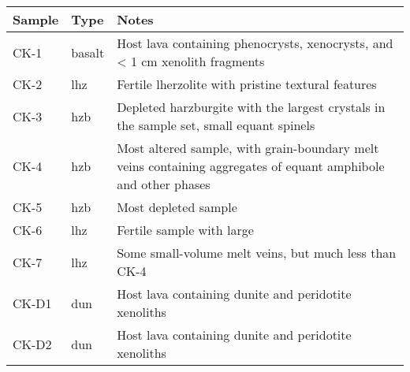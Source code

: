 \begin{tabularx}{\textwidth}{l l X}
\toprule
  Sample & Type & Notes \\
\midrule
  CK-1 & basalt & Host lava containing phenocrysts, xenocrysts, and < 1 cm xenolith fragments \\
  CK-2 & lhz & Fertile lherzolite with pristine textural features \\
  CK-3 & hzb & Depleted harzburgite with the largest crystals in the sample set, small equant spinels \\
  CK-4 & hzb & Most altered sample, with grain-boundary melt veins containing aggregates of equant amphibole and other phases \\
  CK-5 & hzb & Most depleted sample \\
  CK-6 & lhz & Fertile sample with large \\
  CK-7 & lhz & Some small-volume melt veins, but much less than CK-4 \\
  CK-D1 & dun & Host lava containing dunite and peridotite xenoliths \\
  CK-D2 & dun & Host lava containing dunite and peridotite xenoliths \\
\bottomrule
\end{tabularx}
